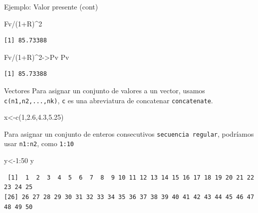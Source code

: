 \documentclass[
  ignorenonframetext,
  aspectratio=169,
  spanish,
]{beamer}
\newenvironment{Shaded}{\begin{snugshade}}{\end{snugshade}}
\newcommand{\DecValTok}[1]{\textcolor[rgb]{0.68,0.00,0.00}{#1}}
\newcommand{\FloatTok}[1]{\textcolor[rgb]{0.68,0.00,0.00}{#1}}
\newcommand{\FunctionTok}[1]{\textcolor[rgb]{0.28,0.35,0.67}{#1}}
\newcommand{\NormalTok}[1]{\textcolor[rgb]{0.00,0.23,0.31}{#1}}
\newcommand{\OtherTok}[1]{\textcolor[rgb]{0.00,0.23,0.31}{#1}}
\newcommand{\SpecialCharTok}[1]{\textcolor[rgb]{0.37,0.37,0.37}{#1}}
\begin{document}
\begin{frame}[fragile]{Ejemplo: Valor presente (cont)}
\label{ejemplo-valor-presente-cont}
\begin{Shaded}
\begin{Highlighting}[]
\NormalTok{Fv}\SpecialCharTok{/}\NormalTok{(}\DecValTok{1}\SpecialCharTok{+}\NormalTok{R)}\SpecialCharTok{\^{}}\DecValTok{2}
\end{Highlighting}
\end{Shaded}

\begin{verbatim}
[1] 85.73388
\end{verbatim}

\begin{Shaded}
\begin{Highlighting}[]
\NormalTok{Fv}\SpecialCharTok{/}\NormalTok{(}\DecValTok{1}\SpecialCharTok{+}\NormalTok{R)}\SpecialCharTok{\^{}}\DecValTok{2}\OtherTok{{-}\textgreater{}}\NormalTok{Pv}
\NormalTok{Pv}
\end{Highlighting}
\end{Shaded}

\begin{verbatim}
[1] 85.73388
\end{verbatim}
\end{frame}

\begin{frame}[fragile]{Vectores}
\label{vectores-1}
Para asignar un conjunto de valores a un vector, usamos
\texttt{c(n1,n2,...,nk)}, \texttt{c} es una abreviatura de concatenar
\texttt{concatenate}.

\begin{Shaded}
\begin{Highlighting}[]
\NormalTok{x}\OtherTok{\textless{}{-}}\FunctionTok{c}\NormalTok{(}\DecValTok{1}\NormalTok{,}\FloatTok{2.6}\NormalTok{,}\FloatTok{4.3}\NormalTok{,}\FloatTok{5.25}\NormalTok{)}
\end{Highlighting}
\end{Shaded}

Para asignar un conjunto de enteros consecutivos
\texttt{secuencia\ regular}, podríamos usar \texttt{n1:n2}, como
\texttt{1:10}

\begin{Shaded}
\begin{Highlighting}[]
\NormalTok{y}\OtherTok{\textless{}{-}}\DecValTok{1}\SpecialCharTok{:}\DecValTok{50}
\NormalTok{y}
\end{Highlighting}
\end{Shaded}

\begin{verbatim}
 [1]  1  2  3  4  5  6  7  8  9 10 11 12 13 14 15 16 17 18 19 20 21 22 23 24 25
[26] 26 27 28 29 30 31 32 33 34 35 36 37 38 39 40 41 42 43 44 45 46 47 48 49 50
\end{verbatim}
\end{frame}
\end{document}
